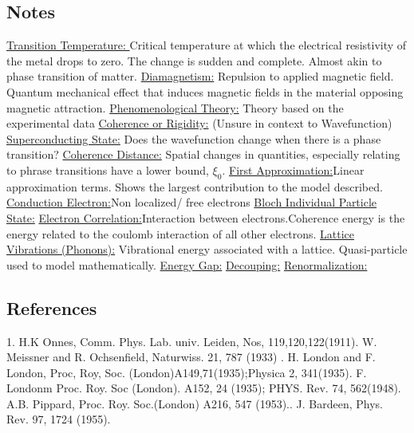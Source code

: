 \documentclass[11pt,letterpaper]{article}
\begin{document}
\subsection*{Notes}
\underline{Transition Temperature: } Critical temperature at which the electrical resistivity of the metal drops to zero. The change is sudden and complete. Almost akin to phase transition of matter. \newline
\underline{Diamagnetism:} Repulsion to applied magnetic field. Quantum mechanical effect that induces magnetic fields in the material opposing magnetic attraction.\newline
\underline{Phenomenological Theory:} Theory based on the experimental data \newline
\underline{Coherence or Rigidity:} (Unsure in context to Wavefunction)\newline
\underline{Superconducting State:} Does the wavefunction change when there is a phase  transition? \newline
\underline{Coherence Distance:} Spatial changes in quantities, especially relating to phrase transitions have a lower bound, $\xi_0$.\newline
\underline{First Approximation:}Linear approximation terms. Shows the largest contribution to the model described.\newline
\underline{Conduction Electron:}Non localized/ free electrons\newline
\underline{Bloch Individual Particle State:} \newline
\underline{Electron Correlation:}Interaction between electrons.Coherence energy is the energy related to the coulomb interaction of all other electrons. \newline
\underline{Lattice Vibrations (Phonons):} Vibrational energy associated with a lattice. Quasi-particle used to model mathematically.\newline
\underline{Energy Gap:} \newline
\underline{Decouping:} \newline
\underline{Renormalization:}\newline
\subsection*{References}
1. H.K Onnes, Comm. Phys. Lab. univ. Leiden, Nos, 119,120,122(1911). W. Meissner and R. Ochsenfield, Naturwiss. 21, 787 (1933) . H. London and F. London, Proc, Roy, Soc. (London)A149,71(1935);Physica 2, 341(1935). F. Londonm Proc. Roy. Soc (London). A152, 24 (1935); PHYS. Rev. 74, 562(1948). A.B. Pippard, Proc. Roy. Soc.(London) A216, 547 (1953).. J. Bardeen, Phys. Rev. 97, 1724 (1955). \newline
\end{document}
